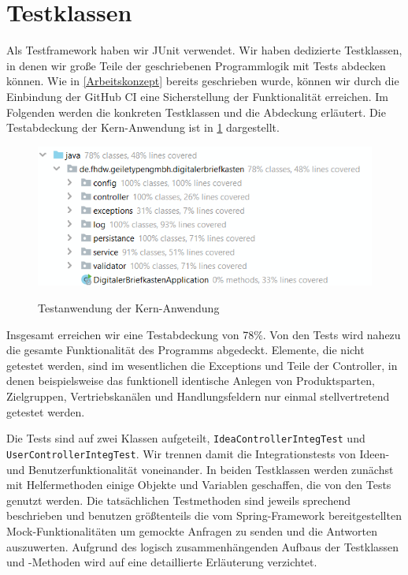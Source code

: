 

\section{Testklassen}

Als Testframework haben wir JUnit verwendet. Wir haben dedizierte Testklassen, in denen wir große Teile der geschriebenen Programmlogik mit Tests abdecken können. Wie in \cref{Arbeitskonzept} bereits geschrieben wurde, können wir durch die Einbindung der GitHub CI eine Sicherstellung der Funktionalität erreichen.
Im Folgenden werden die konkreten Testklassen und die Abdeckung erläutert. Die Testabdeckung der Kern-Anwendung ist in \cref{fig:coverage} dargestellt.

\begin{figure}[hbt]
    \centering
    \begin{minipage}[t]{1\textwidth}
        \caption{Testanwendung der Kern-Anwendung}
        \includegraphics[width=1\textwidth]{img/coverage.png}\\
        \label{fig:coverage}
    \end{minipage}
\end{figure}

Insgesamt erreichen wir eine Testabdeckung von 78\%. Von den Tests wird nahezu die gesamte Funktionalität des Programms abgedeckt. Elemente, die nicht getestet werden, sind im wesentlichen die Exceptions und Teile der Controller, in denen beispielsweise das funktionell identische Anlegen von Produktsparten, Zielgruppen, Vertriebskanälen und Handlungsfeldern nur einmal stellvertretend getestet werden.

Die Tests sind auf zwei Klassen aufgeteilt, \texttt{IdeaControllerIntegTest} und \texttt{UserControllerIntegTest}. Wir trennen damit die Integrationstests von Ideen- und Benutzerfunktionalität voneinander. In beiden Testklassen werden zunächst mit Helfermethoden einige Objekte und Variablen geschaffen, die von den Tests genutzt werden.
Die tatsächlichen Testmethoden sind jeweils sprechend beschrieben und benutzen größtenteils die vom Spring-Framework bereitgestellten Mock-Funktionalitäten um gemockte Anfragen zu senden und die Antworten auszuwerten. Aufgrund des logisch zusammenhängenden Aufbaus der Testklassen und -Methoden wird auf eine detaillierte Erläuterung verzichtet.


